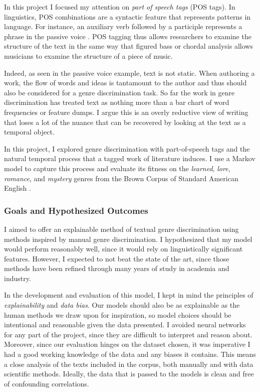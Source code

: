 \documentclass[12pt, titlepage]{article}
\begin{document}
In this project I focused my attention on \textit{part of speech tags} (POS tags). In linguistics, POS combinations are a syntactic feature that represents patterns in language. For instance, an auxiliary verb followed by a participle represents a phrase in the passive voice \cite{POS} \cite{LingAuto}. POS tagging thus allows researchers to examine the structure of the text in the same way that figured bass or chordal analysis allows musicians to examine the structure of a piece of music.

Indeed, as seen in the passive voice example, text is not static. When authoring a work, the flow of words and ideas is tantamount to the author and thus should also be considered for a genre discrimination task. So far the work in genre discrimination has treated text as nothing more than a bar chart of word frequencies or feature dumps. I argue this is an overly reductive view of writing that loses a lot of the nuance that can be recovered by looking at the text as a temporal object.

In this project, I explored genre discrimination with part-of-speech tags and the natural temporal process that a tagged work of literature induces. I use a Markov model to capture this process and evaluate its fitness on the \textit{learned}, \textit{lore}, \textit{romance}, and \textit{mystery} genres from the Brown Corpus of Standard American English \cite{Brown} \cite{BrownManual}.

\subsubsection{Goals and Hypothesized Outcomes}
I aimed to offer an explainable method of textual genre discrimination using methods inspired by manual genre discrimination. I hypothesized that my model would perform reasonably well, since it would rely on linguistically significant features. However, I expected to not beat the state of the art, since those methods have been refined through many years of study in academia and industry.

In the development and evaluation of this model, I kept in mind the principles of \textit{explainability} and \textit{data bias}. Our models should also be as explainable as the human methods we draw upon for inspiration, so model choices should be intentional and reasonable given the data presented. I avoided neural networks for any part of the project, since they are difficult to interpret and reason about. Moreover, since our evaluation hinges on the dataset chosen, it was imperative I had a good working knowledge of the data and any biases it contains. This means a close analysis of the texts included in the corpus, both manually and with data scientific methods. Ideally, the data that is passed to the models is clean and free of confounding correlations.
\end{document}
